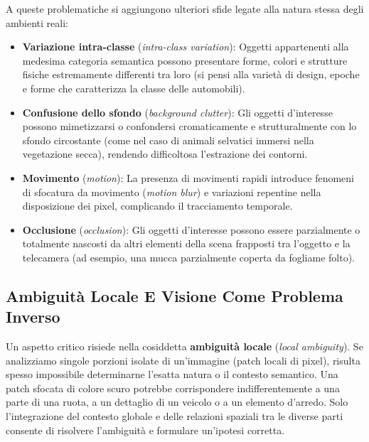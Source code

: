﻿\documentclass[11pt, a4paper]{article}
\begin{document}

A queste problematiche si aggiungono ulteriori sfide legate alla natura stessa degli ambienti reali:
\begin{itemize}[noitemsep]
    \item \textbf{Variazione intra-classe} (\emph{intra-class variation}): Oggetti appartenenti alla medesima categoria semantica possono presentare forme, colori e strutture fisiche estremamente differenti tra loro (si pensi alla varietà di design, epoche e forme che caratterizza la classe delle automobili).
    \item \textbf{Confusione dello sfondo} (\emph{background clutter}): Gli oggetti d'interesse possono mimetizzarsi o confondersi cromaticamente e strutturalmente con lo sfondo circostante (come nel caso di animali selvatici immersi nella vegetazione secca), rendendo difficoltosa l'estrazione dei contorni.
    \item \textbf{Movimento} (\emph{motion}): La presenza di movimenti rapidi introduce fenomeni di sfocatura da movimento (\emph{motion blur}) e variazioni repentine nella disposizione dei pixel, complicando il tracciamento temporale.
    \item \textbf{Occlusione} (\emph{occlusion}): Gli oggetti d'interesse possono essere parzialmente o totalmente nascosti da altri elementi della scena frapposti tra l'oggetto e la telecamera (ad esempio, una mucca parzialmente coperta da fogliame folto).
\end{itemize}


\newpage

\subsection{Ambiguità Locale E Visione Come Problema Inverso}

Un aspetto critico risiede nella cosiddetta \textbf{ambiguità locale} (\emph{local ambiguity}). Se analizziamo singole porzioni isolate di un'immagine (patch locali di pixel), risulta spesso impossibile determinarne l'esatta natura o il contesto semantico. Una patch sfocata di colore scuro potrebbe corrispondere indifferentemente a una parte di una ruota, a un dettaglio di un veicolo o a un elemento d'arredo. Solo l'integrazione del contesto globale e delle relazioni spaziali tra le diverse parti consente di risolvere l'ambiguità e formulare un'ipotesi corretta.
\end{document}
